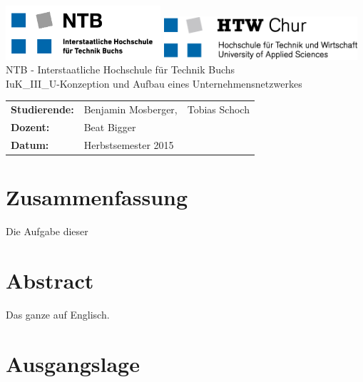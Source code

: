 \documentclass[12pt,a4paper,titlepage]{article}
\begin{document}
\thispagestyle{empty}
\begin{center}
	\includegraphics[height=2cm]{logo_ntb.png}
	\hspace*{6cm}
	\includegraphics[height=1.6cm]{logo_htw.png}\\
	\vspace{5cm}
	\Large{NTB - Interstaatliche Hochschule für Technik Buchs}\\
	\vspace{3cm}
	\Huge{IuK\_III\_U-Konzeption und Aufbau eines Unternehmensnetzwerkes}\\
	\vspace{8cm}
	\Large{}
	\doublespacing
	\begin{tabular}{lll}
		\textbf{Studierende:} & Benjamin Mosberger, &Tobias Schoch \\ 
		\textbf{Dozent:} & Beat Bigger \\
		\textbf{Datum:} & Herbstsemester 2015
	\end{tabular}	
\end{center}
\restoregeometry
\pagebreak

\setcounter{page}{1}
\onehalfspacing 

\section{Zusammenfassung}
Die Aufgabe dieser

\vspace{-1,2em}

\section*{Abstract}
Das ganze auf Englisch.
\pagebreak

\tableofcontents 
\pagebreak

\section{Ausgangslage} 
\end{document}
